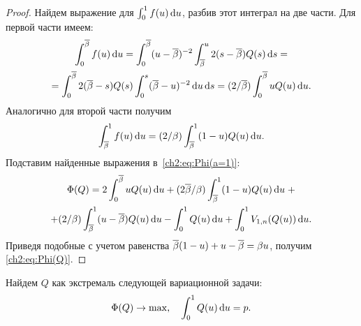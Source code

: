 {\begin{proof}
  Найдем выражение для $\int_0^1 f(u) \mathop{}\!\mathrm{d} u$, разбив этот интеграл на две части.
  Для первой части имеем:
  \begin{multline*}
    \int_0^{{\overline{\beta}}} f(u) \mathop{}\!\mathrm{d} u = \int_0^{{\overline{\beta}}} (u - {\overline{\beta}})^{-2} \int_{{\overline{\beta}}}^u 2(s - {\overline{\beta}}) Q(s) \mathop{}\!\mathrm{d} s = \\
    = \int_0^{{\overline{\beta}}} 2 ({\overline{\beta}} - s) Q(s) \int_0^s ({\overline{\beta}} - u)^{-2} \mathop{}\!\mathrm{d} u \mathop{}\!\mathrm{d} s =
    (2/{\overline{\beta}}) \int_0^{{\overline{\beta}}} u Q(u) \mathop{}\!\mathrm{d} u.
  \end{multline*}
  Аналогично для второй части получим
  \begin{gather*}
    \int_{{\overline{\beta}}}^1 f(u) \mathop{}\!\mathrm{d} u = (2/\beta) \int_{{\overline{\beta}}}^1 (1-u) Q(u) \mathop{}\!\mathrm{d} u.
  \end{gather*}
  Подставим найденные выражения в~\eqref{ch2:eq:Phi(a=1)}:
  \begin{multline*}
    \Phi(Q) = 2 \int_0^{{\overline{\beta}}} u Q(u) \mathop{}\!\mathrm{d} u + (2{\overline{\beta}}/\beta) \int_{{\overline{\beta}}}^1 (1-u) Q(u) \mathop{}\!\mathrm{d} u \; + \\
    + (2/\beta) \int_{{\overline{\beta}}}^1 (u - {\overline{\beta}}) Q(u) \mathop{}\!\mathrm{d} u - \int_0^1 Q(u) \mathop{}\!\mathrm{d} u + \int_0^1
    V_{1,n}(Q(u)) \mathop{}\!\mathrm{d} u.
  \end{multline*}
  Приведя подобные с учетом равенства ${\overline{\beta}} (1-u) + u - {\overline{\beta}} = \beta u$, получим
  \eqref{ch2:eq:Phi(Q)}.
\end{proof}

Найдем $Q$ как экстремаль следующей вариационной задачи:
\begin{align}
  \label{ch2:eq:Q-Problem}
  \Phi(Q) \rightarrow \max, \quad
  \int_0^1 Q(u) \mathop{}\!\mathrm{d} u = p.
\end{align}

}
